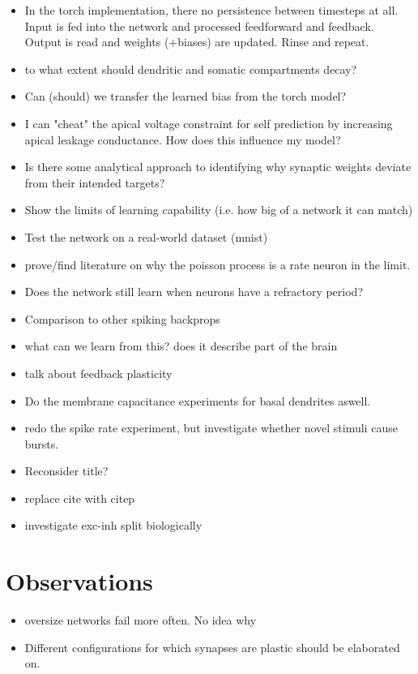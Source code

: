 \begin{itemize}
    \item In the torch implementation, there no persistence between timesteps at all. Input is fed into the network and
    processed feedforward and feedback. Output is read and weights (+biases) are updated. Rinse and repeat.
    \item to what extent should dendritic and somatic compartments decay?
    \item Can (should) we transfer the learned bias from the torch model?
    \item I can "cheat" the apical voltage constraint for self prediction by increasing apical leakage conductance. How
    does this influence my model?
    \item Is there some analytical approach to identifying why synaptic weights deviate from their intended targets?

    \item Show the limits of learning capability (i.e. how big of a network it can match)
    \item Test the network on a real-world dataset (mnist)
    \item prove/find literature on why the poisson process is a rate neuron in the limit.
    \item Does the network still learn when neurons have a refractory period?
    \item Comparison to other spiking backprops
    \item what can we learn from this? does it describe part of the brain
    \item talk about feedback plasticity
    \item Do the membrane capacitance experiments for basal dendrites aswell.
    \item redo the spike rate experiment, but investigate whether novel stimuli cause bursts.
    \item Reconsider title?
    \item replace cite with citep
    \item investigate exc-inh split biologically
\end{itemize}

\section{Observations}

\begin{itemize}
    \item oversize networks fail more often. No idea why
    \item Different configurations for which synapses are plastic should be elaborated on.
\end{itemize}


